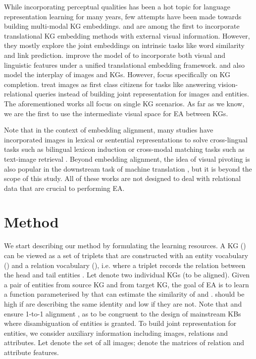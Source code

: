 \documentclass[letterpaper]{article} \usepackage{aaai21}  \usepackage{times}  \usepackage{helvet} \usepackage{courier}  \usepackage[hyphens]{url}  \usepackage{graphicx} \urlstyle{rm} \def\UrlFont{\rm}  \usepackage{natbib}  \usepackage{caption} \frenchspacing  \setlength{\pdfpagewidth}{8.5in}  \setlength{\pdfpageheight}{11in}
\newcommand{\stitle}[1]{\vspace{0.3ex} \noindent{\bf #1}}
\begin{document}
\stitle{Multi-modal KG embeddings.} While incorporating perceptual qualities has been a hot topic for language representation learning for many years, few attempts have been made towards building multi-modal KG embeddings. \citet{xie2017image} and \citet{thoma2017towards} are among the first to incorporate translational KG embedding methods \citep{bordes2013translating} with external visual information. However, they mostly explore the joint embeddings on intrinsic tasks like word similarity and link prediction. \citet{moussellySergieh2018multimodal} improve the model of \citeauthor{xie2017image} to incorporate both visual and linguistic features under a unified translational embedding framework. \citet{pezeshkpour2018embedding} and \citet{rubio2019answering} also model the interplay of images and KGs. However, \citeauthor{pezeshkpour2018embedding} focus specifically on KG completion. \citeauthor{rubio2019answering} treat images as first class citizens for tasks like answering vision-relational queries instead of building joint representation for images and entities. 
The aforementioned works all focus on single KG scenarios.
As far as we know,
we are the first to use the intermediate visual space for EA between KGs.



Note that in the context of embedding alignment, many studies have incorporated images in lexical or sentential representations to solve cross-lingual tasks such as bilingual lexicon induction \citep{vulic2016multi,rotman2018bridging,sigurdsson2020visual} or cross-modal matching tasks such as text-image retrieval \citep{gella2017image,kiros2018illustrative,kiela2018dynamic}. Beyond embedding alignment, the idea of visual pivoting is also popular in the downstream task of machine translation \citep{caglayan2016does,huang2016attention,hitschler2016multimodal,specia2016shared,calixto2017incorporating,barrault2018findings,su2019unsupervised}, but it is beyond the scope of this study. All of these works are not designed to deal with relational data that are crucial to performing EA. 
 \section{Method}
\label{sec:method}


We start describing our method by formulating the learning resources. 
A KG () can be viewed as a set of triplets that are constructed with an entity vocabulary () and a relation vocabulary (),
i.e. 
 where a triplet records the relation  between the head and tail entities . 
Let  denote two individual KGs (to be aligned). Given a pair of entities  from source KG and  from target KG, the goal of EA is to learn a function  parameterised by  that can estimate the similarity of  and .  should be high if  are describing the same identity and low if they are not. 
Note that  and  ensure 1-to-1 alignment \cite{chen2018co,sun2018bootstrapping}, as to be congruent to the design of mainstream KBs \cite{lehmann2015dbpedia,rebele2016yago} where disambiguation of entities is granted. To build joint representation for entities, we consider auxiliary information including images, relations and attributes. Let  denote the set of all images;  denote the matrices of relation and attribute features. 
\end{document}
